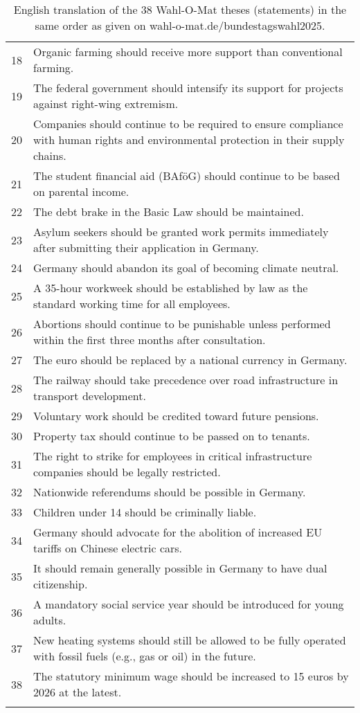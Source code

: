 \documentclass[
	fontsize=10pt,          %
	numbers=noenddot,    	%
    parskip=half,        	%
    listof=totoc,        	%
    bibliography=totoc,  	%
	headsepline=true,       %
	footsepline=false, 		%
    DIV=12                	%
]{scrartcl}
\begin{document}
\begin{longtable}{p{1cm}p{14cm}}
    18 & Organic farming should receive more support than conventional farming. \\
    19 & The federal government should intensify its support for projects against right-wing extremism. \\
    20 & Companies should continue to be required to ensure compliance with human rights and environmental protection in their supply chains. \\
    21 & The student financial aid (BAföG) should continue to be based on parental income. \\
    22 & The debt brake in the Basic Law should be maintained. \\
    23 & Asylum seekers should be granted work permits immediately after submitting their application in Germany. \\
    24 & Germany should abandon its goal of becoming climate neutral. \\
    25 & A 35-hour workweek should be established by law as the standard working time for all employees. \\
    26 & Abortions should continue to be punishable unless performed within the first three months after consultation. \\
    27 & The euro should be replaced by a national currency in Germany. \\
    28 & The railway should take precedence over road infrastructure in transport development. \\
    29 & Voluntary work should be credited toward future pensions. \\
    30 & Property tax should continue to be passed on to tenants. \\
    31 & The right to strike for employees in critical infrastructure companies should be legally restricted. \\
    32 & Nationwide referendums should be possible in Germany. \\
    33 & Children under 14 should be criminally liable. \\
    34 & Germany should advocate for the abolition of increased EU tariffs on Chinese electric cars. \\
    35 & It should remain generally possible in Germany to have dual citizenship. \\
    36 & A mandatory social service year should be introduced for young adults. \\
    37 & New heating systems should still be allowed to be fully operated with fossil fuels (e.g., gas or oil) in the future. \\
    38 & The statutory minimum wage should be increased to 15 euros by 2026 at the latest. \\
    \bottomrule
\caption{English translation of the 38 Wahl-O-Mat theses (statements) in the same order as given on wahl-o-mat.de/bundestagswahl2025.}
\end{longtable}
\end{document}
